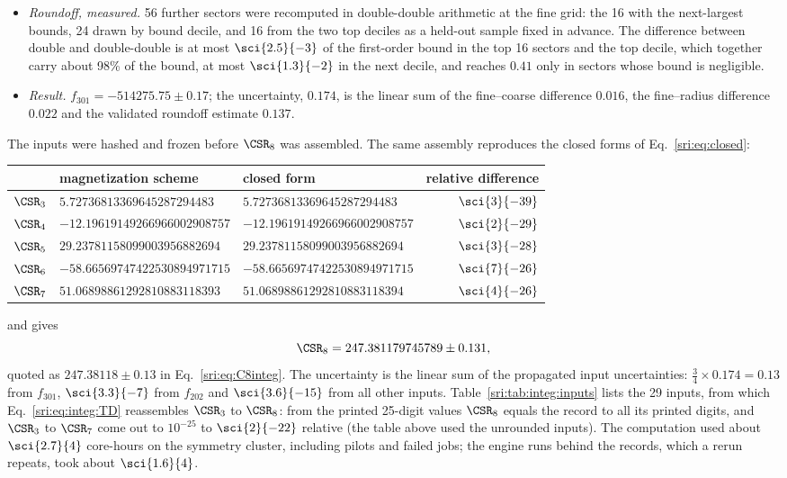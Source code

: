 \begin{itemize}
 A of Appendix~\ref{sri:app:integ:disclosures}).
\item \emph{Roundoff, measured.} 56 further sectors were recomputed in double-double arithmetic at the fine grid: the
 16 with the next-largest bounds, 24 drawn by bound decile, and 16 from the two top deciles as a held-out sample fixed
 in advance. The difference between double and double-double is at most $\sci{2.5}{-3}$ of the first-order bound in the
 top 16 sectors and the top decile, which together carry about 98\% of the bound, at most $\sci{1.3}{-2}$ in the next
 decile, and reaches $0.41$ only in sectors whose bound is negligible.
\item \emph{Result.} $f_{301}=-514275.75\pm0.17$; the uncertainty, $0.174$, is the linear sum of the fine--coarse difference $0.016$, the
 fine--radius difference $0.022$ and the validated roundoff estimate $0.137$.
\end{itemize}
The inputs were hashed and frozen before $\CSR_8$ was assembled. The same assembly reproduces the closed forms of
Eq.~\eqref{sri:eq:closed}:
\begin{center}\small
\begin{tabular}{@{}lllr@{}}
\toprule
& magnetization scheme & closed form & relative difference\\
\midrule
$\CSR_3$ & $5.72736813369645287294483$ & $5.72736813369645287294483$ & $\sci{3}{-39}$\\
$\CSR_4$ & $-12.19619149266966002908757$ & $-12.19619149266966002908757$ & $\sci{2}{-29}$\\
$\CSR_5$ & $29.23781158099003956882694$ & $29.23781158099003956882694$ & $\sci{3}{-28}$\\
$\CSR_6$ & $-58.66569747422530894971715$ & $-58.66569747422530894971715$ & $\sci{7}{-26}$\\
$\CSR_7$ & $51.06898861292810883118393$ & $51.06898861292810883118394$ & $\sci{4}{-26}$\\
\bottomrule
\end{tabular}
\end{center}
and gives
\begin{equation}
 \CSR_8=247.381179745789\pm0.131,
\end{equation}
quoted as $247.38118\pm0.13$ in Eq.~\eqref{sri:eq:C8integ}. The uncertainty is the linear sum of the propagated input
uncertainties: $\frac34\times0.174=0.13$ from $f_{301}$, $\sci{3.3}{-7}$ from $f_{202}$ and $\sci{3.6}{-15}$ from all
other inputs. Table~\ref{sri:tab:integ:inputs} lists the 29 inputs, from which Eq.~\eqref{sri:eq:integ:TD} reassembles
$\CSR_3$ to $\CSR_8$: from the printed 25-digit values $\CSR_8$ equals the record to all its printed digits, and
$\CSR_3$ to $\CSR_7$ come out to $10^{-25}$ to $\sci{2}{-22}$ relative (the table above used the unrounded inputs). The computation used about $\sci{2.7}{4}$ core-hours on the symmetry cluster, including pilots and failed jobs; the
engine runs behind the records, which a rerun repeats, took about $\sci{1.6}{4}$.

